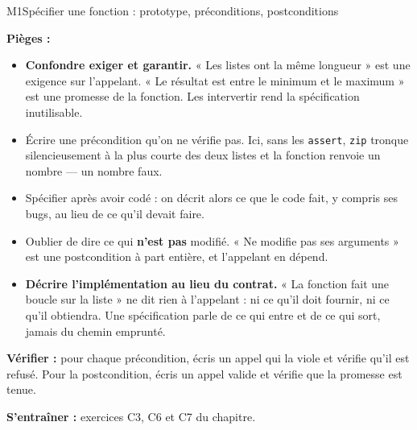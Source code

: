 \begin{fichemethode}{M1}{Spécifier une fonction : prototype, préconditions, postconditions}

\textbf{Pièges :}
\begin{itemize}
  \item \textbf{Confondre exiger et garantir.} « Les listes ont la même longueur » est une
    exigence sur l'appelant. « Le résultat est entre le minimum et le maximum » est une
    promesse de la fonction. Les intervertir rend la spécification inutilisable.
  \item Écrire une précondition qu'on ne vérifie pas. Ici, sans les \lstinline{assert},
    \lstinline{zip} tronque silencieusement à la plus courte des deux listes et la fonction
    renvoie un nombre — un nombre faux.
  \item Spécifier après avoir codé : on décrit alors ce que le code fait, y compris ses
    bugs, au lieu de ce qu'il devait faire.
  \item Oublier de dire ce qui \textbf{n'est pas} modifié. « Ne modifie pas ses arguments »
    est une postcondition à part entière, et l'appelant en dépend.
  \item \textbf{Décrire l'implémentation au lieu du contrat.} « La fonction fait une boucle
    sur la liste » ne dit rien à l'appelant : ni ce qu'il doit fournir, ni ce qu'il obtiendra.
    Une spécification parle de ce qui entre et de ce qui sort, jamais du chemin emprunté.
\end{itemize}

\textbf{Vérifier :} pour chaque précondition, écris un appel qui la viole et vérifie qu'il
est refusé. Pour la postcondition, écris un appel valide et vérifie que la promesse est
tenue.

\textbf{S'entraîner :} exercices C3, C6 et C7 du chapitre.
\end{fichemethode}
